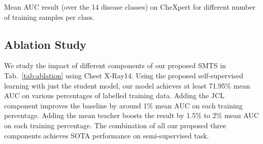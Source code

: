 \documentclass[runningheads]{llncs}
\begin{document}
\vspace{-.2in}
\begin{table}[t!]
    \begin{minipage}{.5\textwidth}
      \centering
      \caption{Mean AUC result (over the 14 disease classes) on CheXpert for different number of training samples per class.}
      \label{tab:chexpert}
    \end{minipage}
    \begin{minipage}{.5\textwidth}
      \centering
      \caption{AUC, Sensitivity and F1 result on ISIC2018 using 20\% of labelled training samples.}
      \vspace{-.2in}
      \label{tab:isic}
    \end{minipage}
  \end{table}


\subsection{Ablation Study}

We study the impact of different components of our proposed SMTS in Tab.~\ref{tab:ablation} using Chest X-Ray14. Using the proposed self-supervised learning with just the student model, our model achieves at least 71.95\% mean AUC on various percentages of labelled training data. Adding the JCL component improves the baseline by around 1\% mean AUC on each training percentage. Adding the mean teacher boosts the result by 1.5\% to 2\% mean AUC on each training percentage.
The combination of all our proposed three components achieves SOTA performance on semi-supervised task.
\end{document}
